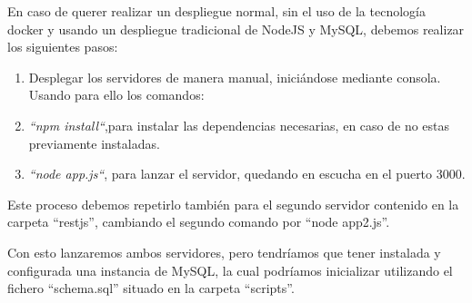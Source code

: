 En caso de querer realizar un despliegue normal, sin el uso de la tecnología docker y usando un despliegue tradicional de NodeJS y MySQL, debemos realizar los siguientes pasos:

\begin{enumerate}
\item Desplegar los servidores de manera manual, iniciándose mediante
  consola. Usando para ello los comandos:

  \item \textit{“npm install“},para instalar las dependencias necesarias,
    en caso de no estas previamente instaladas.
  \item \textit{“node app.js“}, para lanzar el servidor, quedando en
    escucha en el puerto 3000.
\end{enumerate}

  Este proceso debemos repetirlo también para el segundo servidor contenido
  en la carpeta “restjs”, cambiando el segundo comando por “node app2.js”.

  Con esto lanzaremos ambos servidores, pero tendríamos que tener instalada
  y configurada una instancia de MySQL, la cual podríamos inicializar
  utilizando el fichero “schema.sql” situado en la carpeta “scripts”.



  

